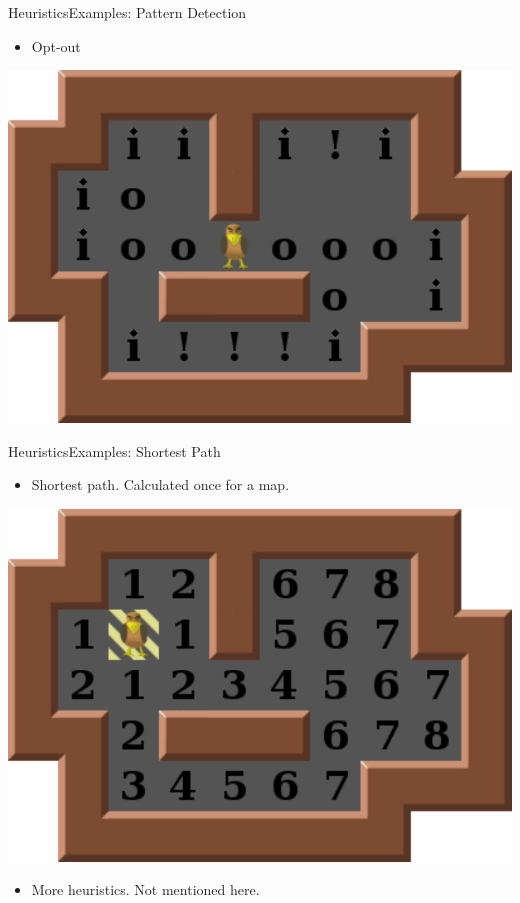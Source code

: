 \begin{frame}{Heuristics}{Examples: Pattern Detection}
  \begin{itemize}
  \item Opt-out
  \end{itemize}
  \begin{center}
    \includegraphics[height=0.7\textheight]{cornermarkings.pdf}
  \end{center}
\end{frame}

\begin{frame}{Heuristics}{Examples: Shortest Path}
  \begin{itemize}
  \item Shortest path. Calculated once for a map.
  \end{itemize}
  \begin{center}
    \includegraphics[height=0.5\textheight]{distances.pdf}
  \end{center}
  \begin{itemize}
  \item More heuristics. Not mentioned here.
  \end{itemize}
\end{frame}


